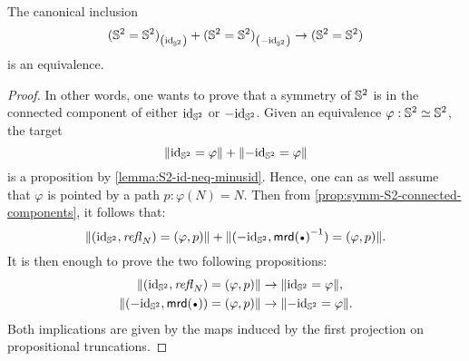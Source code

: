 \documentclass[english,a4]{article}
\begin{document}
\begin{proposition}
  The canonical inclusion
  \begin{displaymath}
    {({{\mathbb S^{2}}}= {{\mathbb S^{2}}})}_{\left(\mathord{\mathrm{id}}_{{\mathbb S^{2}}}\right)} + {({{\mathbb S^{2}}} = {{\mathbb S^{2}}})}_{\left(-\mathord{\mathrm{id}}_{{\mathbb S^{2}}}\right)} \to ({{\mathbb S^{2}}} = {{\mathbb S^{2}}})
  \end{displaymath}
  is an equivalence.
  \label{prop:symm-S2-connected-components}
\end{proposition}
\begin{proof}
  In other words, one wants to prove that a symmetry of ${{\mathbb S^{2}}}$ is in the
  connected component of either $\mathord{\mathrm{id}}_{{\mathbb S^{2}}}$ or $-\mathord{\mathrm{id}}_{{\mathbb S^{2}}}$. Given an equivalence
  $\varphi:{{\mathbb S^{2}}} \simeq {{\mathbb S^{2}}}$, the target 
  \begin{displaymath}
    \lVert\mathord{\mathrm{id}}_{{\mathbb S^{2}}} = \varphi\rVert + \lVert-\mathord{\mathrm{id}}_{{\mathbb S^{2}}} = \varphi\rVert
  \end{displaymath}
  is a proposition by \cref{lemma:S2-id-neq-minusid}. Hence, one can as well
  assume that $\varphi$ is pointed by a path $p:\varphi(N) = N$. Then from
  \cref{prop:symm-S2-connected-components}, it follows that:
  \begin{displaymath}
    \Trunc{(\id_\Sp,\refl N) = (\varphi, p)} + \Trunc{(-\id_\Sp,\inv{\mrd(\base)}) = (\varphi, p)}.
  \end{displaymath}
  It is then enough to prove the two following propositions:
  \begin{align*}
    \Trunc{(\id_\Sp,\refl N) = (\varphi, p)} &\to \Trunc{\id_\Sp = \varphi},
    \\
    \Trunc{(-\id_\Sp,\mrd(\base)) = (\varphi, p)} &\to \Trunc{-\id_\Sp = \varphi}.
  \end{align*}
  Both implications are given by the maps induced by the first projection on
  propositional truncations.
\end{proof}
\end{document}
